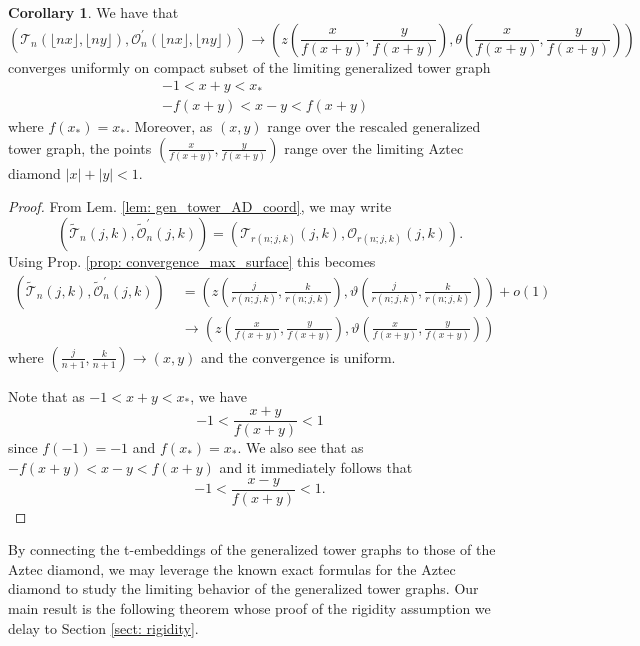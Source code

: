 \documentclass[12pt]{amsart}
\numberwithin{equation}{section}
\theoremstyle{definition}
\newtheorem{cor}[thm]{Corollary}
\begin{document}
\begin{cor}
    \label{cor: gen_tower_limit_surface}
    We have that
    \[
    \left(\mathcal{T}_n(\lfloor n x \rfloor, \lfloor n y \rfloor), \mathcal{O}_n^{\prime}(\lfloor n x \rfloor, \lfloor n y \rfloor)\right) \to \left(z\left(\frac{x}{f(x+y)},\frac{y}{f(x+y)}\right),\theta\left(\frac{x}{f(x+y)},\frac{y}{f(x+y)}\right)\right)
    \]
    converges uniformly on compact subset of the limiting generalized tower graph
    \[
    \begin{aligned}
        &-1 < x+y < x_* \\
        &-f(x+y) < x-y < f(x+y)
    \end{aligned}
    \]
    where $f(x_*)=x_*$. Moreover, as $(x,y)$ range over the rescaled generalized tower graph, the points $\left(\frac{x}{f(x+y)},\frac{y}{f(x+y)}\right)$ range over the limiting Aztec diamond $|x|+|y|<1$.
\end{cor}
\begin{proof}
    From Lem. \ref{lem: gen_tower_AD_coord}, we may write
    \[
    \left(\widetilde{\mathcal{T}}_n(j, k), \widetilde{\mathcal{O}}_n^{\prime}(j, k)\right) = \left(\mathcal{T}_{r(n;j,k)}(j,k),\mathcal{O}_{r(n;j,k)}(j,k)\right).
    \]
    Using Prop. \ref{prop: convergence_max_surface} this becomes
    \[
    \begin{aligned}
     \left(\widetilde{\mathcal{T}}_n(j, k), \widetilde{\mathcal{O}}_n^{\prime}(j, k)\right) &\;= \left(z\left(\frac{j}{r(n;j,k)},\frac{k}{r(n;j,k)}\right),\vartheta\left(\frac{j}{r(n;j,k)},\frac{k}{r(n;j,k)}\right)\right) + o(1) \\
     &\;\to \left(z\left(\frac{x}{f(x+y)},\frac{y}{f(x+y)}\right),\vartheta\left(\frac{x}{f(x+y)},\frac{y}{f(x+y)}\right)\right)
     \end{aligned}
    \]
    where $\left(\frac{j}{n+1},\frac{k}{n+1}\right)\to (x,y)$ and the convergence is uniform.

    Note that as $-1 < x+y < x_*$, we have
    \[
    -1 < \frac{x+y}{f(x+y)}  < 1  
    \]
    since $f(-1)=-1$ and $f(x_*)=x_*$. We also see that as $-f(x+y) < x-y < f(x+y)$ and it immediately follows that
    \[
    -1 < \frac{x-y}{f(x+y)}  < 1.
    \]
\end{proof}


By connecting the t-embeddings of the generalized tower graphs to those of the Aztec diamond, we may leverage the known exact formulas for the Aztec diamond to study the limiting behavior of the generalized tower graphs. Our main result is the following theorem whose proof of the rigidity assumption we delay to Section \ref{sect: rigidity}.
\end{document}
